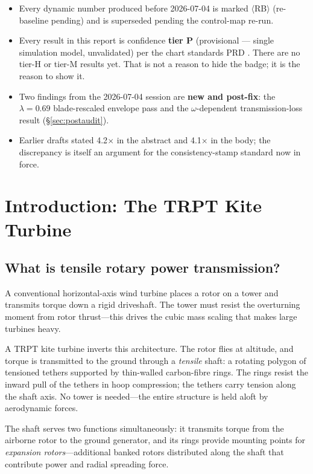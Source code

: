 \documentclass[11pt,a4paper]{article}
\newcommand{\RB}{$\langle$RB$\rangle$}  %
\begin{document}
\begin{itemize}
\item Every dynamic number produced before 2026-07-04 is marked \RB{} (re-baseline pending)
      and is superseded pending the control-map re-run.
\item Every result in this report is confidence \textbf{tier P} (provisional --- single simulation model,
      unvalidated) per the chart standards PRD \cite{chartprd}. There are no tier-H or tier-M results yet.
      That is not a reason to hide the badge; it is the reason to show it.
\item Two findings from the 2026-07-04 session are \textbf{new and post-fix}: the $\lambda = 0.69$
      blade-rescaled envelope pass and the $\omega$-dependent transmission-loss result (\S\ref{sec:postaudit}).
\item Earlier drafts stated 4.2$\times$ in the abstract and 4.1$\times$ in the body;
      the discrepancy is itself an argument for the consistency-stamp standard now in force.
\end{itemize}

\section{Introduction: The TRPT Kite Turbine}

\subsection{What is tensile rotary power transmission?}

A conventional horizontal-axis wind turbine places a rotor on a tower and transmits torque
down a rigid driveshaft. The tower must resist the overturning moment from rotor thrust---this
drives the cubic mass scaling that makes large turbines heavy.

A TRPT kite turbine \cite{tulloch2023} inverts this architecture. The rotor flies at altitude,
and torque is transmitted to the ground through a \emph{tensile} shaft: a rotating polygon of
tensioned tethers supported by thin-walled carbon-fibre rings. The rings resist the inward pull
of the tethers in hoop compression; the tethers carry tension along the shaft axis.
No tower is needed---the entire structure is held aloft by aerodynamic forces.

The shaft serves two functions simultaneously: it transmits torque from the airborne rotor to
the ground generator, and its rings provide mounting points for \emph{expansion rotors}---additional
banked rotors distributed along the shaft that contribute power and radial spreading force.
\end{document}
